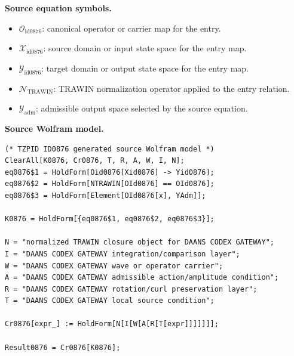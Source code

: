 \begin{minipage}[t]{0.49\linewidth}
\begingroup
\small
\raggedright
\textbf{Source equation symbols.}\par
\begin{itemize}[leftmargin=1.35em,itemsep=1pt,topsep=1pt,parsep=0pt]
    \item $\mathcal{O}_{\mathrm{id0876}}$: canonical operator or carrier map for the entry.
    \item $\mathcal{X}_{\mathrm{id0876}}$: source domain or input state space for the entry map.
    \item $\mathcal{Y}_{\mathrm{id0876}}$: target domain or output state space for the entry map.
    \item $\mathcal{N}_{\mathrm{TRAWIN}}$: TRAWIN normalization operator applied to the entry relation.
    \item $\mathcal{Y}_{\mathrm{adm}}$: admissible output space selected by the source equation.
\end{itemize}
\endgroup
\end{minipage}\hfill
\begin{minipage}[t]{0.47\linewidth}
\begingroup
\scriptsize
\raggedright
\textbf{Source Wolfram model.}\par
\begin{Verbatim}[fontsize=\tiny,breaklines=true,breakanywhere=true]
(* TZPID ID0876 generated source Wolfram model *)
ClearAll[K0876, Cr0876, T, R, A, W, I, N];
eq0876$1 = HoldForm[Oid0876[Xid0876] -> Yid0876];
eq0876$2 = HoldForm[NTRAWIN[OId0876] == OId0876];
eq0876$3 = HoldForm[Element[OId0876[x], YAdm]];

K0876 = HoldForm[{eq0876$1, eq0876$2, eq0876$3}];

N = "normalized TRAWIN closure object for DAANS CODEX GATEWAY";
I = "DAANS CODEX GATEWAY integration/comparison layer";
W = "DAANS CODEX GATEWAY wave or operator carrier";
A = "DAANS CODEX GATEWAY admissible action/amplitude condition";
R = "DAANS CODEX GATEWAY rotation/curl preservation layer";
T = "DAANS CODEX GATEWAY local source condition";

Cr0876[expr_] := HoldForm[N[I[W[A[R[T[expr]]]]]]];

Result0876 = Cr0876[K0876];
\end{Verbatim}
\endgroup
\end{minipage}

